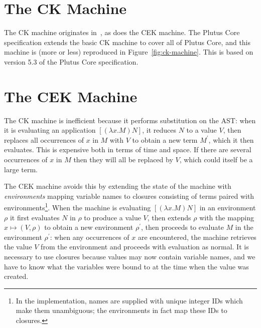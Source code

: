 \documentclass[a4paper]{article}
\begin{document}
\section{The CK Machine}
The CK machine originates in~\cite{Felleisen-Cek}, as does the CEK
machine.  The Plutus Core specification extends the basic CK machine
to cover all of Plutus Core, and this machine is (more or less)
reproduced in Figure~\ref{fig:ck-machine}.  This is based on version
5.3 of the Plutus Core specification.


\newpage



\newpage


\section{The CEK Machine}
The CK machine is inefficient because it performs substitution on the
AST: when it is evaluating an application $[(\lambda x.M) N]$, it
reduces $N$ to a value $V$, then replaces all occurrences of $x$ in
$M$ with $V$ to obtain a new term $M^\prime$, which it then evaluates.
This is expensive both in terms of time and space.  If there are
several occurrences of $x$ in $M$ then they will all be replaced by
$V$, which could itself be a large term.

The CEK machine avoids this by extending the state of the machine with
\textit{environments} mapping variable names to closures consisting of
terms paired with environments\footnote{In the implementation, names
  are supplied with unique integer IDs which make them unambiguous;
  the environments in fact map these IDs to closures.}.  When the
machine is evaluating $[(\lambda x.M) N]$ in an environment $\rho$ it
first evaluates $N$ in $\rho$ to produce a value $V$, then extends
$\rho$ with the mapping $x \mapsto (V,\rho)$ to obtain a new
environment $\rho^{\prime}$, then proceeds to evaluate $M$ in the
environment $\rho^\prime$: when any occurrences of $x$ are encountered,
the machine retrieves the value $V$ from the environment and proceeds
with evaluation as normal.  It is necessary to use closures because
values may now contain variable names, and we have to know what the
variables were bound to at the time when the value was created.
\end{document}
